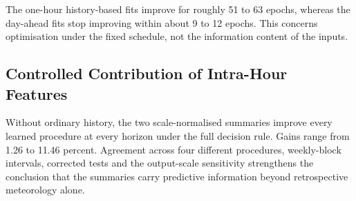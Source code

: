 The one-hour history-based fits improve for roughly 51 to 63 epochs, whereas the day-ahead fits stop improving within about 9 to 12 epochs. This concerns optimisation under the fixed schedule, not the information content of the inputs.

\subsection{Controlled Contribution of Intra-Hour Features}

Without ordinary history, the two scale-normalised summaries improve every learned procedure at every horizon under the full decision rule. Gains range from 1.26 to 11.46 percent. Agreement across four different procedures, weekly-block intervals, corrected tests and the output-scale sensitivity strengthens the conclusion that the summaries carry predictive information beyond retrospective meteorology alone.

